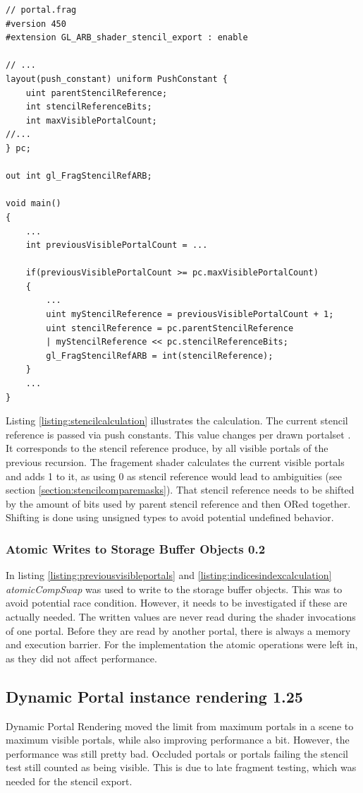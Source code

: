 \begin{lstlisting}[caption={Calculate Stencil Reference in Shader}, label=listing:stencilcalculation]
// portal.frag
#version 450
#extension GL_ARB_shader_stencil_export : enable

// ...
layout(push_constant) uniform PushConstant {	
	uint parentStencilReference;
	int stencilReferenceBits;
	int maxVisiblePortalCount;
//...
} pc;

out int gl_FragStencilRefARB;

void main()
{
	...
	int previousVisiblePortalCount = ...
	
	if(previousVisiblePortalCount >= pc.maxVisiblePortalCount)
	{
		...
		uint myStencilReference = previousVisiblePortalCount + 1;
		uint stencilReference = pc.parentStencilReference 
		| myStencilReference << pc.stencilReferenceBits;
		gl_FragStencilRefARB = int(stencilReference);
	}	
	...
}
\end{lstlisting}

Listing \ref{listing:stencilcalculation} illustrates the calculation. The current stencil reference is passed via push constants. This value changes per drawn \gls{portalset} . It corresponds to the stencil reference produce, by all visible portals of the previous recursion. The fragement shader calculates the current visible portals and adds 1 to it, as using 0 as stencil reference would lead to ambiguities (see section \ref{section:stencilcomparemasks}). That stencil reference needs to be shifted by the amount of bits used by parent stencil reference and then ORed together. Shifting is done using unsigned types to avoid potential undefined behavior.

\subsubsection{Atomic Writes to Storage Buffer Objects 0.2}
In listing \ref{listing:previousvisibleportals} and \ref{listing:indicesindexcalculation} \textit{atomicCompSwap} was used to write to the storage buffer objects. This was to avoid potential race condition. However, it needs to be investigated if these are actually needed. The written values are never read during the shader invocations of one portal. Before they are read by another portal, there is always a memory and execution barrier. For the implementation the atomic operations were left in, as they did not affect performance.

\subsection{Dynamic Portal instance rendering 1.25}
\label{section:dynamicportalinstancerendering}
Dynamic Portal Rendering moved the limit from maximum portals in a scene to maximum visible portals, while also improving performance a bit. However, the performance was still pretty bad. Occluded portals or portals failing the stencil test still counted as being visible. This is due to late fragment testing, which was needed for the stencil export.

